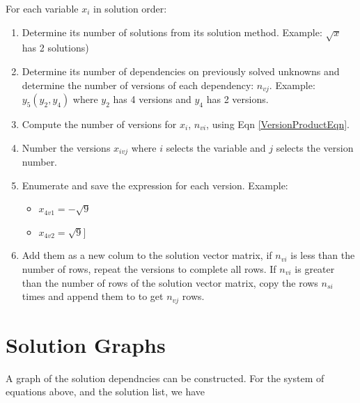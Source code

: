 \documentclass[letterpaper]{article}
\begin{document}
\noindent
For each variable $x_i$ in solution order:
\begin{enumerate}
  \item Determine its number of solutions from its solution method. Example: $\sqrt{x}$ has 2 solutions)
  \item Determine its number of dependencies on previously solved unknowns and determine
  the number of versions of each dependency: $n_{vj}$.  Example: $y_5(y_2, y_4)$ where
  $y_2$ has 4 versions and $y_4$ has 2 versions.
  \item Compute the number of versions for $x_i$, $n_{vi}$,  using Eqn \ref{VersionProductEqn}.
  \item Number the versions $x_{ivj}$ where $i$ selects the variable and $j$ selects the
  version number.
  \item Enumerate and save the expression for each  version.  Example:
     \begin{itemize}
        \item $x_{4v1} = -\sqrt{9}$
        \item $x_{4v2} =  \sqrt{9}]$
     \end{itemize}
  \item Add them as a new colum to the solution vector matrix,
  if $n_{vi}$ is less than the number of rows, repeat the versions to
  complete all rows.
  If $n_{vi}$ is greater than the number of rows of the solution vector matrix,
  copy the rows $n_{si}$ times and append them to to get $n_{vj}$ rows.
\end{enumerate}


\section{Solution Graphs}

A graph of the solution dependncies can be constructed.   For the system of equations above, and
the solution list, we have



%
\end{document}
